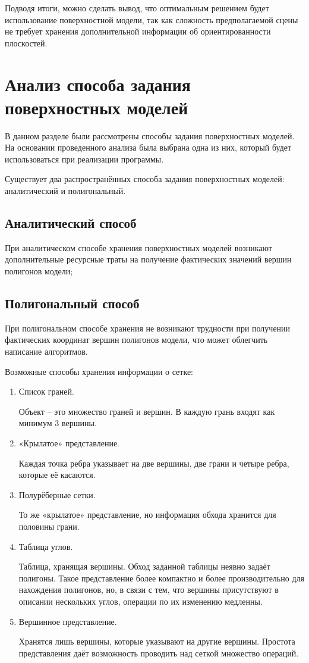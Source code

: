 Подводя итоги, можно сделать вывод, что оптимальным решением будет использование поверхностной модели, так как сложность предполагаемой сцены не требует хранения дополнительной информации об ориентированности плоскостей.


\section{Анализ способа задания поверхностных моделей}

В данном разделе были рассмотрены способы задания поверхностных моделей. На основании проведенного анализа была выбрана одна из них, который будет использоваться при реализации программы.

Существует два распространённых способа задания поверхностных моделей: аналитический и полигональный.

\subsection{Аналитический способ}

При аналитическом способе хранения поверхностных моделей возникают дополнительные ресурсные траты на получение фактических значений вершин полигонов модели;

\subsection{Полигональный способ}

При полигональном способе хранения не возникают трудности при получении фактических координат вершин полигонов модели, что может облегчить написание алгоритмов.

Возможные способы хранения информации о сетке:

\begin{enumerate}
	\item Список граней.
	
	Объект – это множество граней и вершин. В каждую грань входят как минимум 3 вершины.
	
	\item «Крылатое» представление.
	
	Каждая точка ребра указывает на две вершины, две грани и четыре ребра, которые её касаются.
	
	\item Полурёберные сетки.
	
	То же «крылатое» представление, но информация обхода хранится для половины грани.
	
	\item Таблица углов.
	
	Таблица, хранящая вершины. Обход заданной таблицы неявно задаёт полигоны. Такое представление более компактно и более производительно для нахождения полигонов, но, в связи с тем, что вершины присутствуют в описании нескольких углов, операции по их изменению медленны.
	
	\item Вершинное представление.
	
	Хранятся лишь вершины, которые указывают на другие вершины. Простота представления даёт возможность проводить над сеткой множество операций.
\end{enumerate}

